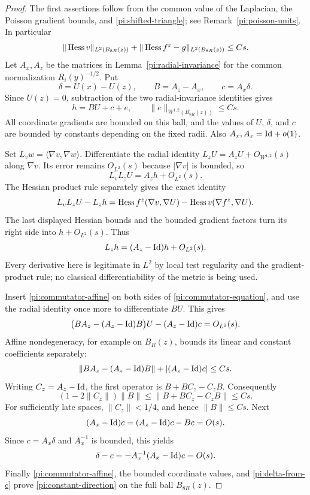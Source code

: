 \begin{proof}
The first assertions follow from the common value of the Laplacian,
the Poisson gradient bounds, and
\eqref{pi:shifted-triangle}; see
Remark~\ref{pi:poisson-units}.  In particular
\[
 \|\operatorname{Hess} v\|_{L^2(B_{8R}(z))}
 +\|\operatorname{Hess} f^z-g\|_{L^2(B_{8R}(z))}\le Cs.
\]
Let $A_x,A_z$ be the matrices in
Lemma~\ref{pi:radial-invariance} for the common normalization
$R_i(y)^{-1/2}$.  Put
\[
 \delta=U(x)-U(z),\qquad B=A_z-A_x,\qquad c=A_x\delta.
\]
Since $U(z)=0$, subtraction of the two radial-invariance identities
gives
\begin{equation}
 h=BU+c+e,\qquad
 \|e\|_{W^{1,2}(B_{8R}(z))}\le Cs.
 \label{pi:commutator-affine}
\end{equation}
All coordinate gradients are bounded on this ball, and the values
of $U$, $\delta$, and $c$ are bounded by constants depending on
the fixed radii.  Also $A_x,A_z=\mathrm{Id}+o(1)$.

Set $L_vw=\langle\nabla v,\nabla w\rangle$.  Differentiate
the radial identity $L_zU=A_zU+O_{W^{1,2}}(s)$ along $\nabla v$.
Its error remains $O_{L^2}(s)$ because $|\nabla v|$ is bounded,
so
\[
 L_vL_zU=A_zh+O_{L^2}(s).
\]
The Hessian product rule separately gives the exact identity
\[
 L_vL_zU-L_zh
 =\operatorname{Hess} f^z(\nabla v,\nabla U)
       -\operatorname{Hess} v(\nabla f^z,\nabla U).
\]
The last displayed Hessian bounds and the bounded gradient factors
turn its right side into $h+O_{L^2}(s)$.  Thus
\begin{equation}
 L_zh=(A_z-\mathrm{Id})h+O_{L^2}(s).
 \label{pi:commutator-equation}
\end{equation}
Every derivative here is legitimate in $L^2$ by local test
regularity and the gradient-product rule; no classical
differentiability of the metric is being used.

Insert \eqref{pi:commutator-affine} on both sides of
\eqref{pi:commutator-equation}, and use the radial identity once
more to differentiate $BU$.  This gives
\[
 \bigl(BA_z-(A_z-\mathrm{Id})B\bigr)U-(A_z-\mathrm{Id})c
 =O_{L^2}(s).
\]
Affine nondegeneracy, for example on $B_R(z)$, bounds its linear
and constant coefficients separately:
\begin{equation}
 \|BA_z-(A_z-\mathrm{Id})B\|+|(A_z-\mathrm{Id})c|\le Cs.
 \label{pi:commutator-coefficients}
\end{equation}
Writing $C_z=A_z-\mathrm{Id}$, the first operator is
$B+BC_z-C_zB$.  Consequently
\[
 (1-2\|C_z\|)\|B\|
 \le\|B+BC_z-C_zB\|\le Cs.
\]
For sufficiently late spaces, $\|C_z\|<1/4$, and hence
$\|B\|\le Cs$.  Next
\[
 (A_x-\mathrm{Id})c=(A_z-\mathrm{Id})c-Bc=O(s).
\]
Since $c=A_x\delta$ and $A_x^{-1}$ is bounded, this yields
\begin{equation}
 \delta-c=-A_x^{-1}(A_x-\mathrm{Id})c=O(s).
 \label{pi:delta-from-c}
\end{equation}
Finally \eqref{pi:commutator-affine}, the bounded coordinate
values, and \eqref{pi:delta-from-c} prove
\eqref{pi:constant-direction} on the full ball $B_{8R}(z)$.
\end{proof}

